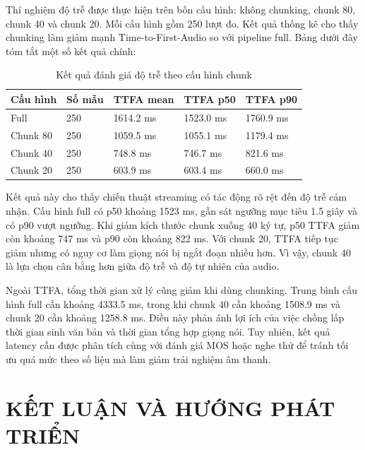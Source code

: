 \documentclass[a4paper,13pt,oneside]{report}
\begin{document}
Thí nghiệm độ trễ được thực hiện trên bốn cấu hình: không chunking, chunk 80, chunk 40 và chunk 20. Mỗi cấu hình gồm 250 lượt đo. Kết quả thống kê cho thấy chunking làm giảm mạnh Time-to-First-Audio so với pipeline full. Bảng dưới đây tóm tắt một số kết quả chính:

\begin{table}[H]
    \centering
    \caption{Kết quả đánh giá độ trễ theo cấu hình chunk}
    \begin{tabular}{|p{2.5cm}|p{2cm}|p{2.5cm}|p{2.5cm}|p{2.5cm}|}
        \hline
        \textbf{Cấu hình} & \textbf{Số mẫu} & \textbf{TTFA mean} & \textbf{TTFA p50} & \textbf{TTFA p90} \\
        \hline
        Full              & 250             & 1614.2 ms          & 1523.0 ms         & 1760.9 ms         \\
        \hline
        Chunk 80          & 250             & 1059.5 ms          & 1055.1 ms         & 1179.4 ms         \\
        \hline
        Chunk 40          & 250             & 748.8 ms           & 746.7 ms          & 821.6 ms          \\
        \hline
        Chunk 20          & 250             & 603.9 ms           & 603.4 ms          & 660.0 ms          \\
        \hline
    \end{tabular}
\end{table}

Kết quả này cho thấy chiến thuật streaming có tác động rõ rệt đến độ trễ cảm nhận. Cấu hình full có p50 khoảng 1523 ms, gần sát ngưỡng mục tiêu 1.5 giây và có p90 vượt ngưỡng. Khi giảm kích thước chunk xuống 40 ký tự, p50 TTFA giảm còn khoảng 747 ms và p90 còn khoảng 822 ms. Với chunk 20, TTFA tiếp tục giảm nhưng có nguy cơ làm giọng nói bị ngắt đoạn nhiều hơn. Vì vậy, chunk 40 là lựa chọn cân bằng hơn giữa độ trễ và độ tự nhiên của audio.

Ngoài TTFA, tổng thời gian xử lý cũng giảm khi dùng chunking. Trung bình cấu hình full cần khoảng 4333.5 ms, trong khi chunk 40 cần khoảng 1508.9 ms và chunk 20 cần khoảng 1258.8 ms. Điều này phản ánh lợi ích của việc chồng lấp thời gian sinh văn bản và thời gian tổng hợp giọng nói. Tuy nhiên, kết quả latency cần được phân tích cùng với đánh giá MOS hoặc nghe thử để tránh tối ưu quá mức theo số liệu mà làm giảm trải nghiệm âm thanh.

\chapter{KẾT LUẬN VÀ HƯỚNG PHÁT TRIỂN}
\end{document}
